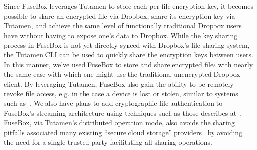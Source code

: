 Since FuseBox leverages Tutamen to store each per-file encryption key,
it becomes possible to share an encrypted file via Dropbox, share its
encryption key via Tutamen, and achieve the same level of functionally
traditional Dropbox users have without having to expose one's data to
Dropbox. While the key sharing process in FuseBox is not yet directly
synced with Dropbox's file sharing system, the Tutamen CLI can be used
to quickly share the encryption keys between users. In this manner,
we've used FuseBox to store and share encrypted files with nearly the
same ease with which one might use the traditional unencrypted Dropbox
client. By leveraging Tutamen, FuseBox also gain the ability to be
remotely revoke file access, e.g. in the case a device is lost or
stolen, similar to systems such as~\cite{geambasu2011}. We also have
plans to add cryptographic file authentication to FuseBox's streaming
architecture using techniques such as those describes
at~\cite{McGrew2005}. FuseBox, via Tutamen's distributed operation
mode, also avoids the sharing pitfalls associated many existing
``secure cloud storage'' providers~\cite{wilson2014} by avoiding the
need for a single trusted party facilitating all sharing operations.

